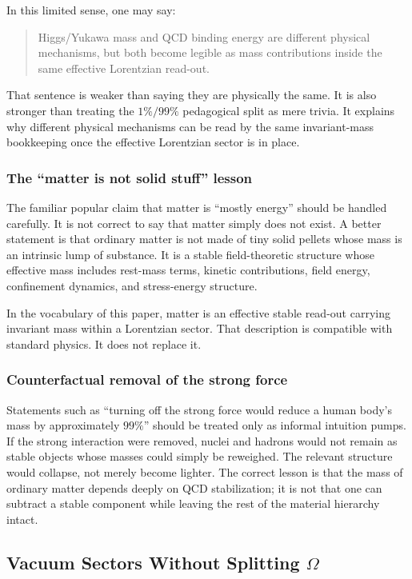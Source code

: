 \documentclass[12pt,a4paper]{article}
\theoremstyle{definition}
\theoremstyle{remark}
\begin{document}
In this limited sense, one may say:

\begin{quote}
Higgs/Yukawa mass and QCD binding energy are different physical mechanisms, but both become legible as mass contributions inside the same effective Lorentzian read-out.
\end{quote}

That sentence is weaker than saying they are physically the same. It is also stronger than treating the $1\%/99\%$ pedagogical split as mere trivia. It explains why different physical mechanisms can be read by the same invariant-mass bookkeeping once the effective Lorentzian sector is in place.

\subsubsection{The ``matter is not solid stuff'' lesson}

The familiar popular claim that matter is ``mostly energy'' should be handled carefully. It is not correct to say that matter simply does not exist. A better statement is that ordinary matter is not made of tiny solid pellets whose mass is an intrinsic lump of substance. It is a stable field-theoretic structure whose effective mass includes rest-mass terms, kinetic contributions, field energy, confinement dynamics, and stress-energy structure.

In the vocabulary of this paper, matter is an effective stable read-out carrying invariant mass within a Lorentzian sector. That description is compatible with standard physics. It does not replace it.

\subsubsection{Counterfactual removal of the strong force}

Statements such as ``turning off the strong force would reduce a human body's mass by approximately $99\%$'' should be treated only as informal intuition pumps. If the strong interaction were removed, nuclei and hadrons would not remain as stable objects whose masses could simply be reweighed. The relevant structure would collapse, not merely become lighter. The correct lesson is that the mass of ordinary matter depends deeply on QCD stabilization; it is not that one can subtract a stable component while leaving the rest of the material hierarchy intact.

\subsection{Vacuum Sectors Without Splitting \texorpdfstring{$\Omega$}{Omega}}
\label{sec:vacuum}
\end{document}
